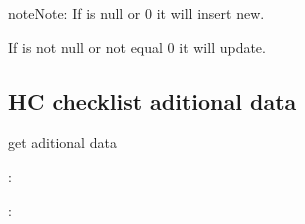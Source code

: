 \documentclass[letterpaper,10pt,english,openany,oneside]{sphinxmanual}
\begin{document}
\begin{fulllineitems}
\begin{sphinxVerbatim}[commandchars=\\\{\}]
                 
                 
                 
             
     
     
     
     
     
\end{sphinxVerbatim}

\end{fulllineitems}


\begin{sphinxadmonition}{note}{Note:}
\sphinxAtStartPar
If  is null or 0 it will insert new.

\sphinxAtStartPar
If  is not null or not equal 0 it will update.
\end{sphinxadmonition}


\subsection{HC checklist aditional data}
\label{\detokenize{api-checklist/v1:hc-checklist-aditional-data}}

\begin{fulllineitems}
\label{\detokenize{api-checklist/v1:post--api-checklist-v1-hc-misdata}}
\sphinxAtStartPar
get aditional data

\sphinxAtStartPar
{}:

\begin{sphinxVerbatim}[commandchars=\\\{\}]
   
\end{sphinxVerbatim}

\sphinxAtStartPar
{}:

\begin{sphinxVerbatim}[commandchars=\\\{\}]
   
\end{sphinxVerbatim}

\end{fulllineitems}
\end{document}
